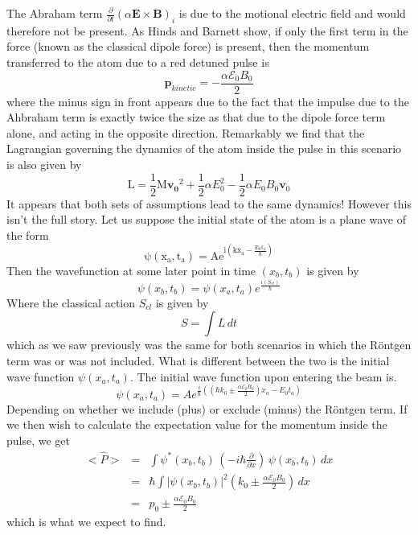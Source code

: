 \documentclass[twocolumn,english,pra,aps,superscriptaddress,floatfix]{revtex4-1}
\begin{document}
The Abraham term $\frac{\partial}{\partial t}\left(\alpha\mathbf{E}\times\mathbf{B}\right)_i$ is due to the motional electric field and would therefore not be present.  As Hinds and Barnett show, if only the first term in the force (known as the classical dipole force) is present, then the momentum transferred to the atom due to a red detuned pulse is 
\begin{equation}
\mathbf{p}_{kinetic}=-\frac{\alpha\mathcal{E}_0B_0}{2}
\end{equation}
where the minus sign in front appears due to the fact that the impulse due to the Ahbraham term is exactly twice the size as that due to the dipole force term alone, and acting in the opposite direction.  Remarkably we find that the Lagrangian governing the dynamics of the atom inside the pulse in this scenario is also given by
\begin{equation}
\mathrm{L}=\frac{1}{2}\mathrm{M}\mathbf{v_0}^2 + \frac{1}{2}\alpha E_0^2 - \frac{1}{2}\alpha E_0 B_0 \mathbf{v}_0
\label{lagrangian3}
\end{equation}
It appears that both sets of assumptions lead to the same dynamics!  However this isn't the full story.  Let us suppose the initial state of the atom is a plane wave of the form
\begin{equation}
\mathrm{\psi(x_a,t_a)=Ae^{i(kx_a-\frac{E_0 t_a}{\hbar})}}
\end{equation}
Then the wavefunction at some later point in time $(x_b,t_b)$ is given by
\begin{equation}
\psi(x_b,t_b)=\psi(x_a,t_a)e^{{\frac{i(S_{cl})}{\hbar}}}
\end{equation}
Where the classical action $S_{cl}$ is given by
\begin{equation}
S=\int L\, dt
\end{equation}
which as we saw previously was the same for both scenarios in which the R\"{o}ntgen term was or was not included.  What is different between the two is the initial wave function   $\psi(x_a,t_a)$.  The initial wave function upon entering the beam is.
\begin{equation}
\psi(x_a,t_a)=Ae^{\frac{i}{\hbar}((\hbar k_0 \pm\frac{\alpha\mathcal{E}_0B_0}{2})x_a-E_0 t_a)}
\end{equation}
Depending on whether we include (plus) or exclude (minus) the R\"{o}ntgen term.  If we then wish to calculate the expectation value for the momentum inside the pulse, we get
\begin{eqnarray}
<\hat{P}>&=&\int\psi^{*}(x_b,t_b)\,\left(-i\hbar\frac{\partial}{\partial x}\right)\,\psi(x_b,t_b)\,dx \nonumber \\
&=&\hbar\int|\psi(x_b,t_b)|^2(k_0\pm\frac{\alpha\mathcal{E}_0B_0}{2})\,dx \nonumber \\
&=& p_0\pm\frac{\alpha\mathcal{E}_0B_0}{2}
\end{eqnarray}
which is what we expect to find.  
\end{document}

